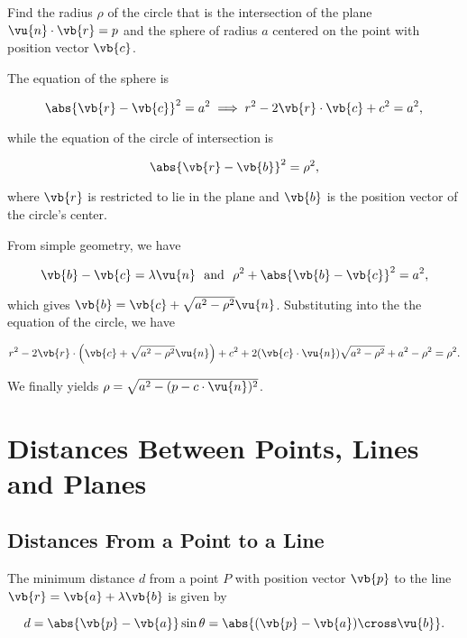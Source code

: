 \documentclass[a4paper,12pt]{report}
\begin{document}
{Find the radius \(\rho \) of the circle that is the intersection of the plane \(\vu{n} \cdot \vb{r} = p\) and the sphere of radius \(a\) centered on the point with position vector \(\vb{c} \).}
{The equation of the sphere is 

\begin{equation}
    \abs{\vb{r} - \vb{c} }^2= a^2 \implies r^2 - 2\vb{r} \cdot \vb{c} +c^2= a^2, 
\end{equation}
    
while the equation of the circle of intersection is 

\begin{equation}
    \abs{\vb{r} - \vb{b} }^2 = \rho ^2, 
\end{equation}

where \(\vb{r} \) is restricted to lie in the plane and \(\vb{b} \) is the position vector of the circle's center.

From simple geometry, we have

\begin{equation}
    \vb{b} - \vb{c} = \lambda \vu{n} ~\text { and }~ \rho ^2 + \abs{\vb{b} -\vb{c} }^2 = a^2, 
\end{equation}

which gives \(\vb{b} = \vb{c} + \sqrt{a^2-\rho ^2}\vu{n}  \). Substituting into the the equation of the circle, we have

\begin{equation}
    r^2- 2\vb{r} \cdot \left( \vb{c} + \sqrt{a^2- \rho ^2} \vu{n}  \right) + c^2 + 2(\vb{c} \cdot \vu{n} )\sqrt{a^2-\rho ^2}+a^2-\rho ^2 = \rho ^2.
\end{equation}

We finally yields \(\rho = \sqrt{a^2- (p-c \cdot \vu{n} )^2} \). 

} 

\section{Distances Between Points, Lines and Planes}

\subsection{Distances From a Point to a Line}

The minimum distance \(d\) from a point \(P\) with position vector \(\vb{p} \) to the line \(\vb{r} = \vb{a} + \lambda \vb{b} \) is given by 

\begin{equation}
    d = \abs{\vb{p} -\vb{a} }\sin \theta = \abs{(\vb{p} -\vb{a} )\cross \vu{b}  }. 
\end{equation}
\end{document}
